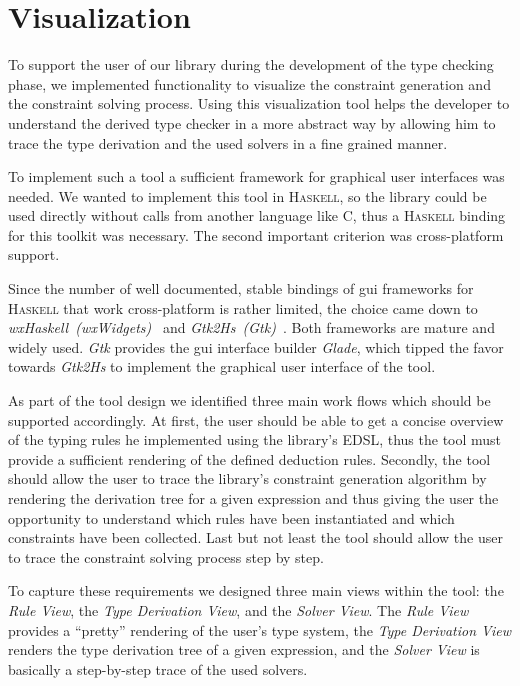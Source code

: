 \section{Visualization}



To support the user of our library during the development of the type
checking phase, we implemented functionality to visualize the
constraint generation and the constraint solving process. Using this
visualization tool helps the developer to understand the derived type
checker in a more abstract way by allowing him to trace the type
derivation and the used solvers in a fine grained manner.

To implement such a tool a sufficient framework for graphical user
interfaces was needed. We wanted to implement this tool in
\textsc{Haskell}, so the library could be used directly without calls
from another language like \textsc{C}, thus a \textsc{Haskell} binding
for this toolkit was necessary. The second important criterion was
cross-platform support.

Since the number of well documented, stable bindings of gui frameworks
for \textsc{Haskell} that work cross-platform is rather limited, the
choice came down to \textit{wxHaskell~(wxWidgets)}~\cite{wxWidgets}
and \textit{Gtk2Hs~(Gtk)}~\cite{gtk}. Both frameworks are mature and
widely used. \textit{Gtk} provides the gui interface builder
\textit{Glade}, which tipped the favor towards \textit{Gtk2Hs} to
implement the graphical user interface of the tool.

As part of the tool design we identified three main work flows which
should be supported accordingly. At first, the user should be able to
get a concise overview of the typing rules he implemented using the
library's EDSL, thus the tool must provide a sufficient rendering of
the defined deduction rules. Secondly, the tool should allow the user
to trace the library's constraint generation algorithm by rendering
the derivation tree for a given expression and thus giving the user
the opportunity to understand which rules have been instantiated and
which constraints have been collected. Last but not least the tool
should allow the user to trace the constraint solving process step by
step.

To capture these requirements we designed three main views within the
tool: the \textit{Rule View}, the \textit{Type Derivation View}, and
the \textit{Solver View}. The \textit{Rule View} provides a ``pretty''
rendering of the user's type system, the \textit{Type Derivation View}
renders the type derivation tree of a given expression, and the
\textit{Solver View} is basically a step-by-step trace of the used
solvers.

